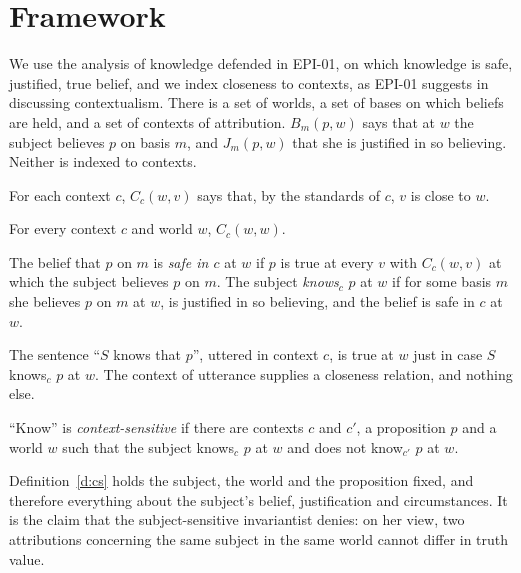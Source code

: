 \documentclass{situationist-preprint}
\begin{document}
\section{Framework}

We use the analysis of knowledge defended in EPI-01, on which knowledge is safe, justified, true belief, and we index closeness to contexts, as EPI-01 suggests in discussing contextualism. There is a set of worlds, a set of bases on which beliefs are held, and a set of contexts of attribution. $B_m(p,w)$ says that at $w$ the subject believes $p$ on basis $m$, and $J_m(p,w)$ that she is justified in so believing. Neither is indexed to contexts.

\begin{definition}\label{d:close}
For each context $c$, $C_c(w,v)$ says that, by the standards of $c$, $v$ is close to $w$.
\end{definition}

\begin{assumption}[Centring]\label{a:centring}
For every context $c$ and world $w$, $C_c(w,w)$.
\end{assumption}

\begin{definition}\label{d:know}
The belief that $p$ on $m$ is \emph{safe in $c$} at $w$ if $p$ is true at every $v$ with $C_c(w,v)$ at which the subject believes $p$ on $m$. The subject \emph{knows$_c$} $p$ at $w$ if for some basis $m$ she believes $p$ on $m$ at $w$, is justified in so believing, and the belief is safe in $c$ at $w$.
\end{definition}

The sentence \enquote{$S$ knows that $p$}, uttered in context $c$, is true at $w$ just in case $S$ knows$_c$ $p$ at $w$. The context of utterance supplies a closeness relation, and nothing else.

\begin{definition}\label{d:cs}
\enquote{Know} is \emph{context-sensitive} if there are contexts $c$ and $c'$, a proposition $p$ and a world $w$ such that the subject knows$_c$ $p$ at $w$ and does not know$_{c'}$ $p$ at $w$.
\end{definition}

Definition~\ref{d:cs} holds the subject, the world and the proposition fixed, and therefore everything about the subject's belief, justification and circumstances. It is the claim that the subject-sensitive invariantist denies: on her view, two attributions concerning the same subject in the same world cannot differ in truth value.
\end{document}
